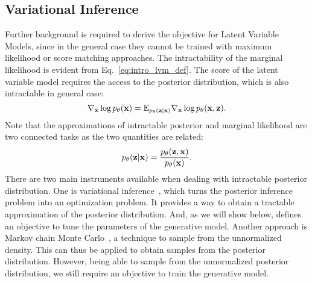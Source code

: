 \subsection{Variational Inference}\label{sec:intro_vi}
Further background is required to derive the objective for Latent Variable Models, since in the general case they cannot be trained with maximum likelihood or score matching approaches. The intractability of the marginal likelihood is evident from Eq.~\ref{eq:intro_lvm_def}. The score of the latent variable model requires the access to the posterior distribution, which is also intractable in general case:
\begin{equation}
\nabla_{{\mathbf{x}}}\log p_{\theta}({\mathbf{x}}) = \mathbb{E}_{p_{\theta}({\mathbf{z}}|{\mathbf{x}})} \nabla_{{\mathbf{x}}}\log p_{\theta}({\mathbf{x}}, {\mathbf{z}}).    
\end{equation}
Note that the approximations of intractable posterior and marginal likelihood are two connected tasks as the two quantities are related:
\begin{equation}
    p_{\theta}({\mathbf{z}}|{\mathbf{x}}) = \frac{p_{\theta}({\mathbf{z}}, {\mathbf{x}})}{p_{\theta}({\mathbf{x}})}.
\end{equation}
There are two main instruments available when dealing with intractable posterior distribution. One is variational inference~\citep{jordan1999introduction}, which turns the posterior inference problem into an optimization problem. It provides a way to obtain a tractable approximation of the posterior distribution. And, as we will show below, defines an objective to tune the parameters of the generative model.
Another approach is Markov chain Monte Carlo~\citep{neal1993probabilistic}, a technique to sample from the unnormalized density. 
This can thus be applied to obtain samples from the posterior distribution. 
However, being able to sample from the unnormalized posterior distribution, we still require an objective to train the generative model. 

